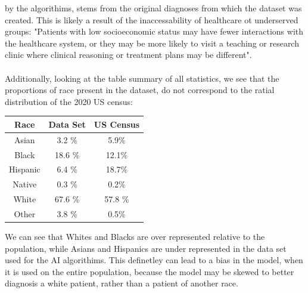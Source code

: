 \documentclass[12pt, letterpaper]{article}
\begin{document}
\begin{enumerate}
    by the algorithims, stems from the original diagnoses from which the dataset was created. This is likely a result of the 
    inaccessability of healthcare ot underserved groups: "Patients with low socioeconomic status may have fewer interactions 
    with the healthcare system, or they may be more likely to visit a teaching or research clinic where clinical reasoning or 
    treatment plans may be different". \\ \\
    Additionally, looking at the table summary of all statistics, we see that the proportions of race present in the dataset, do not
    correspond to the ratial distribution of the 2020 US census: 
    \begin{center}
            \begin{tabular}{c || c | c}
            Race & Data Set & US Census \\
            \hline \hline
            Asian &  3.2 \% & 5.9\% \\
            \hline
            Black & 18.6 \% &  12.1\%\\
            \hline
            Hispanic & 6.4 \%& 18.7\% \\
            \hline
            Native & 0.3 \% & 0.2\% \\
            \hline
            White & 67.6 \% & 57.8 \% \\
            \hline
            Other & 3.8 \% & 0.5\%
            \end{tabular}   
    \end{center}
    We can see that Whites and Blacks are over represented relative to the population, while Asians and Hispanics are under represented 
    in the data set used for the AI algorithims. This definetley can lead to a bias in the model, when it is used on the entire population, 
    because the model may be skewed to better diagnosis a white patient, rather than a patient of another race. 
\end{enumerate}
\end{document}
